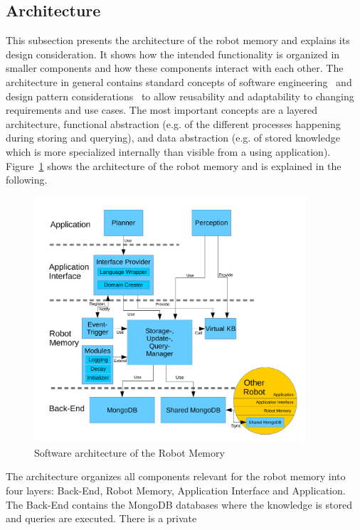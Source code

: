 \documentclass[a4paper,11pt]{article}
\newcommand{\reffig}[1]{Figure~\ref{#1}}
\begin{document}
\subsection{Architecture}
\label{sec:arch}
This subsection presents the architecture of the robot memory and
explains its design consideration. It shows how the intended
functionality is organized in smaller components and how these
components interact with each other.  The architecture in general
contains standard concepts of software
engineering~\cite{software-architecture} and design pattern
considerations~\cite{design-patterns} to allow reusability and
adaptability to changing requirements and use cases. The most
important concepts are a layered architecture, functional abstraction
(e.g. of the different processes happening during storing and
querying), and data abstraction (e.g. of stored knowledge which is
more specialized internally than visible from a using
application). \reffig{fig:arch} shows the architecture of the robot
memory and is explained in the following.
\begin{figure}
  \centering
  \includegraphics[width=0.9\textwidth]{architecture.pdf}
  \caption{Software architecture of the Robot Memory}
  \label{fig:arch}
\end{figure}
The architecture organizes all components relevant for the robot
memory into four layers: Back-End, Robot Memory, Application Interface
and Application. The Back-End contains the MongoDB databases where the
knowledge is stored and queries are executed. There is a private
\end{document}
